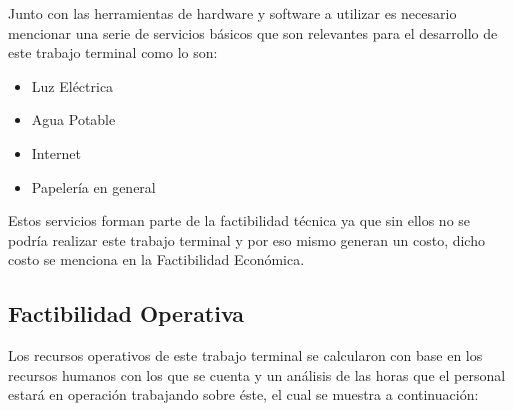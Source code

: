 \documentclass[12pt, a4paper, titlepage]{report}
\begin{document}
    		Junto con las herramientas de hardware y software a utilizar es necesario mencionar una serie de servicios b\'asicos que son relevantes para el desarrollo de este trabajo terminal como lo son:
    		\begin{itemize}
    		    \item Luz Eléctrica
    		    \item Agua Potable
    		    \item Internet
    		    \item Papelería en general
    		\end{itemize}
    		Estos servicios forman parte de la factibilidad técnica ya que sin ellos no se podría realizar este trabajo terminal y por eso mismo generan un costo, dicho costo se menciona en la Factibilidad Económica.
    		
    	    \subsection{Factibilidad Operativa}
    	    Los recursos operativos de este trabajo terminal se calcularon con base en los recursos humanos con los que se cuenta y un análisis de las horas que el personal estará en operación trabajando sobre éste, el cual se muestra a continuación:
    	    
\end{document}
